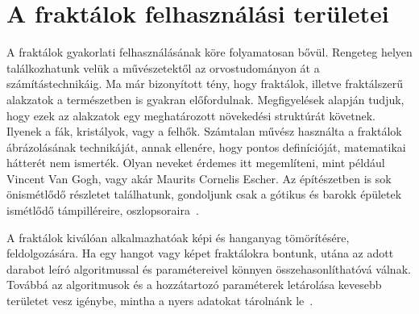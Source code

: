 \section{A fraktálok felhasználási területei}
A fraktálok gyakorlati felhasználásának köre folyamatosan bővül. Rengeteg helyen találkozhatunk velük a művészetektől az orvostudományon át a számítástechnikáig. Ma már bizonyított tény, hogy fraktálok, illetve fraktálszerű alakzatok a természetben is gyakran előfordulnak. Megfigyelések alapján tudjuk, hogy ezek az alakzatok egy meghatározott növekedési struktúrát követnek. Ilyenek a fák, kristályok, vagy a felhők. Számtalan művész használta a fraktálok ábrázolásának technikáját, annak ellenére, hogy pontos definícióját, matematikai hátterét nem ismerték.
Olyan neveket érdemes itt megemlíteni, mint például Vincent Van Gogh, vagy akár Maurits Cornelis Escher. Az építészetben is sok önismétlődő részletet találhatunk, gondoljunk csak a gótikus és barokk épületek ismétlődő támpilléreire, oszlopsoraira~\cite{alkalmazas}.
\par A fraktálok kiválóan alkalmazhatóak képi és hanganyag tömörítésére, feldolgozására. Ha egy hangot vagy képet fraktálokra bontunk, utána az adott darabot leíró algoritmussal és paramétereivel könnyen összehasonlíthatóvá válnak. Továbbá az algoritmusok és a hozzátartozó paraméterek letárolása kevesebb területet vesz igénybe, mintha a nyers adatokat tárolnánk le~\cite{alkalmazas}.